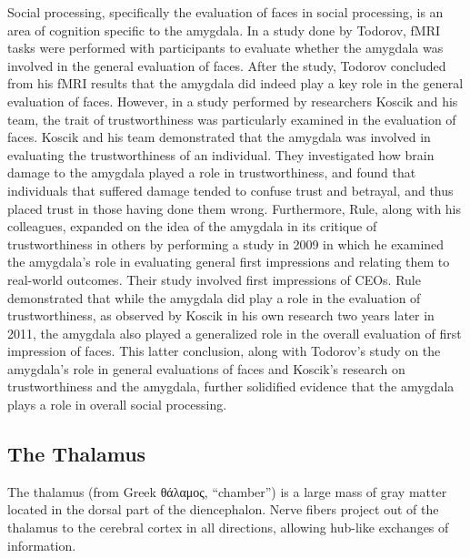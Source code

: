 Social processing, specifically the evaluation of faces in social processing, is an area of cognition specific to the amygdala. In a study done by Todorov, fMRI tasks were performed with participants to evaluate whether the amygdala was involved in the general evaluation of faces. After the study, Todorov concluded from his fMRI results that the amygdala did indeed play a key role in the general evaluation of faces. However, in a study performed by researchers Koscik and his team, the trait of trustworthiness was particularly examined in the evaluation of faces. Koscik and his team demonstrated that the amygdala was involved in evaluating the trustworthiness of an individual. They investigated how brain damage to the amygdala played a role in trustworthiness, and found that individuals that suffered damage tended to confuse trust and betrayal, and thus placed trust in those having done them wrong. Furthermore, Rule, along with his colleagues, expanded on the idea of the amygdala in its critique of trustworthiness in others by performing a study in 2009 in which he examined the amygdala's role in evaluating general first impressions and relating them to real-world outcomes. Their study involved first impressions of CEOs. Rule demonstrated that while the amygdala did play a role in the evaluation of trustworthiness, as observed by Koscik in his own research two years later in 2011, the amygdala also played a generalized role in the overall evaluation of first impression of faces. This latter conclusion, along with Todorov's study on the amygdala's role in general evaluations of faces and Koscik's research on trustworthiness and the amygdala, further solidified evidence that the amygdala plays a role in overall social processing.

\hypertarget{the-thalamus}{%
\subsection{The Thalamus}\label{the-thalamus}}

The thalamus (from Greek θάλαμος, ``chamber'') is a large mass of gray matter located in the dorsal part of the diencephalon. Nerve fibers project out of the thalamus to the cerebral cortex in all directions, allowing hub-like exchanges of information.



